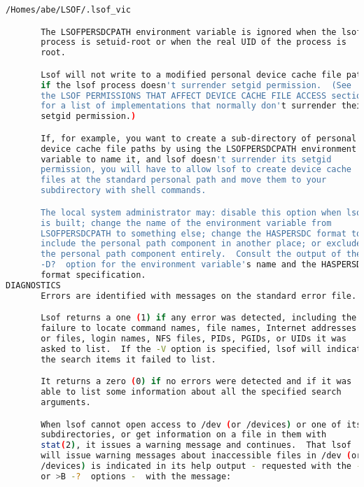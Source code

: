 {{\begin{lstlisting}[language=bash]
            /Homes/abe/LSOF/.lsof_vic

       The LSOFPERSDCPATH environment variable is ignored when the lsof
       process is setuid-root or when the real UID of the process is
       root.

       Lsof will not write to a modified personal device cache file path
       if the lsof process doesn't surrender setgid permission.  (See
       the LSOF PERMISSIONS THAT AFFECT DEVICE CACHE FILE ACCESS section
       for a list of implementations that normally don't surrender their
       setgid permission.)

       If, for example, you want to create a sub-directory of personal
       device cache file paths by using the LSOFPERSDCPATH environment
       variable to name it, and lsof doesn't surrender its setgid
       permission, you will have to allow lsof to create device cache
       files at the standard personal path and move them to your
       subdirectory with shell commands.

       The local system administrator may: disable this option when lsof
       is built; change the name of the environment variable from
       LSOFPERSDCPATH to something else; change the HASPERSDC format to
       include the personal path component in another place; or exclude
       the personal path component entirely.  Consult the output of the
       -D?  option for the environment variable's name and the HASPERSDC
       format specification.
DIAGNOSTICS
       Errors are identified with messages on the standard error file.

       Lsof returns a one (1) if any error was detected, including the
       failure to locate command names, file names, Internet addresses
       or files, login names, NFS files, PIDs, PGIDs, or UIDs it was
       asked to list.  If the -V option is specified, lsof will indicate
       the search items it failed to list.

       It returns a zero (0) if no errors were detected and if it was
       able to list some information about all the specified search
       arguments.

       When lsof cannot open access to /dev (or /devices) or one of its
       subdirectories, or get information on a file in them with
       stat(2), it issues a warning message and continues.  That lsof
       will issue warning messages about inaccessible files in /dev (or
       /devices) is indicated in its help output - requested with the -h
       or >B -?  options -  with the message:


\end{lstlisting}}}
